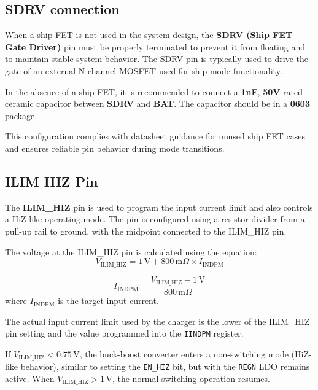 \documentclass[12pt]{article}
\begin{document}
\subsection{SDRV connection}
When a ship FET is not used in the system design, the \textbf{SDRV (Ship FET Gate Driver)} pin must be properly terminated to prevent it from floating and to maintain stable system behavior. The SDRV pin is typically used to drive the gate of an external N-channel MOSFET used for ship mode functionality.

In the absence of a ship FET, it is recommended to connect a \textbf{1nF}, \textbf{50V} rated ceramic capacitor between \textbf{SDRV} and \textbf{BAT}. The capacitor should be in a \textbf{0603} package.

This configuration complies with datasheet guidance for unused ship FET cases and ensures reliable pin behavior during mode transitions.

\subsection{ILIM HIZ Pin}
\label{sec:ILIM-HIZ}
The \textbf{ILIM\_HIZ} pin is used to program the input current limit and also controls a HiZ-like operating mode. The pin is configured using a resistor divider from a pull-up rail to ground, with the midpoint connected to the ILIM\_HIZ pin.

The voltage at the ILIM\_HIZ pin is calculated using the equation:
\begin{equation}
V_{\text{ILIM\_HIZ}} = 1\,\text{V} + 800\,\text{m}\Omega \times I_{\text{INDPM}}
\label{equ:ILIM_HIZ_voltage}
\end{equation}

\begin{equation}
I_{\text{INDPM}} = \frac{V_{\text{ILIM\_HIZ}} - 1\,\text{V}}{800\,\text{m}\Omega}
\label{equ:INDPM_current}
\end{equation}
where \( I_{\text{INDPM}} \) is the target input current.

The actual input current limit used by the charger is the lower of the ILIM\_HIZ pin setting and the value programmed into the \texttt{IINDPM} register.

If \( V_{\text{ILIM\_HIZ}} < 0.75\,\text{V} \), the buck-boost converter enters a non-switching mode (HiZ-like behavior), similar to setting the \texttt{EN\_HIZ} bit, but with the \texttt{REGN} LDO remains active. When \( V_{\text{ILIM\_HIZ}} > 1\,\text{V} \), the normal switching operation resumes.
\end{document}
